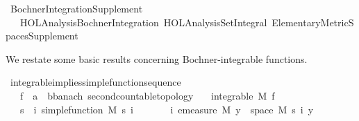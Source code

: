 %
\begin{isabellebody}%
%
%
\isadelimtheory
\isanewline
\isanewline
%
\endisadelimtheory
%
\isatagtheory
{}\isamarkupfalse%
\ Bochner{\isacharunderscore}{\kern0pt}Integration{\isacharunderscore}{\kern0pt}Supplement\isanewline
\ \ \ {\isachardoublequoteopen}HOL{\isacharminus}{\kern0pt}Analysis{\isachardot}{\kern0pt}Bochner{\isacharunderscore}{\kern0pt}Integration{\isachardoublequoteclose}\ {\isachardoublequoteopen}HOL{\isacharminus}{\kern0pt}Analysis{\isachardot}{\kern0pt}Set{\isacharunderscore}{\kern0pt}Integral{\isachardoublequoteclose}\ Elementary{\isacharunderscore}{\kern0pt}Metric{\isacharunderscore}{\kern0pt}Spaces{\isacharunderscore}{\kern0pt}Supplement\isanewline
{}%
\endisatagtheory
{\isafoldtheory}%
%
\isadelimtheory
%
\endisadelimtheory
%
\isadelimdocument
%
\endisadelimdocument
%
\isatagdocument
%
\isamarkuptrue%
%
\isamarkuptrue%
%
\endisatagdocument
{\isafolddocument}%
%
\isadelimdocument
%
\endisadelimdocument
%
\begin{isamarkuptext}%
We restate some basic results concerning Bochner-integrable functions.%
\end{isamarkuptext}\isamarkuptrue%
\isamarkupfalse%
\ integrable{\isacharunderscore}{\kern0pt}implies{\isacharunderscore}{\kern0pt}simple{\isacharunderscore}{\kern0pt}function{\isacharunderscore}{\kern0pt}sequence{\isacharcolon}{\kern0pt}\isanewline
\ \ \ f\ {\isacharcolon}{\kern0pt}{\isacharcolon}{\kern0pt}\ {\isachardoublequoteopen}{\isacharprime}{\kern0pt}a\ {\isasymRightarrow}\ {\isacharprime}{\kern0pt}b{\isacharcolon}{\kern0pt}{\isacharcolon}{\kern0pt}{\isacharbraceleft}{\kern0pt}banach{\isacharcomma}{\kern0pt}\ second{\isacharunderscore}{\kern0pt}countable{\isacharunderscore}{\kern0pt}topology{\isacharbraceright}{\kern0pt}{\isachardoublequoteclose}\isanewline
\ \ \ {\isachardoublequoteopen}integrable\ M\ f{\isachardoublequoteclose}\isanewline
\ \ \ s\ \ {\isachardoublequoteopen}{\isasymAnd}i{\isachardot}{\kern0pt}\ simple{\isacharunderscore}{\kern0pt}function\ M\ {\isacharparenleft}{\kern0pt}s\ i{\isacharparenright}{\kern0pt}{\isachardoublequoteclose}\isanewline
\ \ \ \ \ \ \ {\isachardoublequoteopen}{\isasymAnd}i{\isachardot}{\kern0pt}\ emeasure\ M\ {\isacharbraceleft}{\kern0pt}y\ {\isasymin}\ space\ M{\isachardot}{\kern0pt}\ s\ i\ y\ {\isasymnoteq}\ {}{\isacharbraceright}{\kern0pt}\ {\isasymnoteq}\ {\isasyminfinity}{\isachardoublequoteclose}\isanewline

\end{isabellebody}
